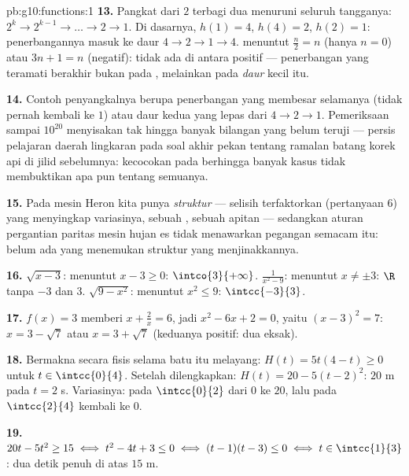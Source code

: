 \begin{solution}{pb:g10:functions:1}
\textbf{13.} Pangkat dari $2$ terbagi dua menuruni seluruh tangganya:
$2^k \to 2^{k-1} \to \dots \to 2 \to 1$. Di dasarnya,
$h(1) = 4$, $h(4) = 2$, $h(2) = 1$: penerbangannya masuk ke daur
$4 \to 2 \to 1 \to 4$.  menuntut $\frac n2 = n$
(hanya $n = 0$) atau $3n + 1 = n$ (negatif): tidak ada di antara
 positif --- penerbangan yang teramati berakhir bukan
pada , melainkan pada \emph{daur} kecil itu.

\textbf{14.} Contoh penyangkalnya berupa penerbangan yang
membesar selamanya (tidak pernah kembali ke $1$) atau daur kedua
yang lepas dari $4 \to 2 \to 1$. Pemeriksaan sampai $10^{20}$
menyisakan tak hingga banyak bilangan yang belum teruji --- persis
pelajaran daerah lingkaran pada soal akhir pekan tentang ramalan
batang korek api di jilid sebelumnya: kecocokan pada berhingga
banyak kasus tidak membuktikan apa pun tentang semuanya.

\textbf{15.} Pada mesin Heron kita punya \emph{struktur} --- selisih
terfaktorkan (pertanyaan 6) yang menyingkap variasinya, sebuah
, sebuah apitan --- sedangkan aturan pergantian paritas mesin
hujan es tidak menawarkan pegangan semacam itu: belum ada yang
menemukan struktur yang menjinakkannya.

\textbf{16.} $\sqrt{x - 3}$: menuntut $x - 3 \geq 0$:
$\intco{3}{+\infty}$. $\frac{1}{x^2 - 9}$: menuntut
$x \neq \pm 3$: $\R$ tanpa $-3$ dan $3$.
$\sqrt{9 - x^2}$: menuntut $x^2 \leq 9$: $\intcc{-3}{3}$.

\textbf{17.} $f(x) = 3$ memberi $x + \frac2x = 6$, jadi
$x^2 - 6x + 2 = 0$, yaitu $(x - 3)^2 = 7$:
$x = 3 - \sqrt7$ atau $x = 3 + \sqrt7$ (keduanya positif: dua 
eksak).

\textbf{18.} Bermakna secara fisis selama batu itu melayang:
$H(t) = 5t(4 - t) \geq 0$ untuk $t \in \intcc{0}{4}$. Setelah dilengkapkan:
$H(t) = 20 - 5(t - 2)^2$:  $20$ m pada $t = 2$ s.
Variasinya:  pada $\intcc{0}{2}$ dari $0$ ke $20$,
lalu  pada $\intcc{2}{4}$ kembali ke $0$.

\textbf{19.} $20t - 5t^2 \geq 15 \iff t^2 - 4t + 3 \leq 0 \iff
(t - 1)(t - 3) \leq 0 \iff t \in \intcc{1}{3}$: dua detik penuh
di atas $15$ m.


\end{solution}

